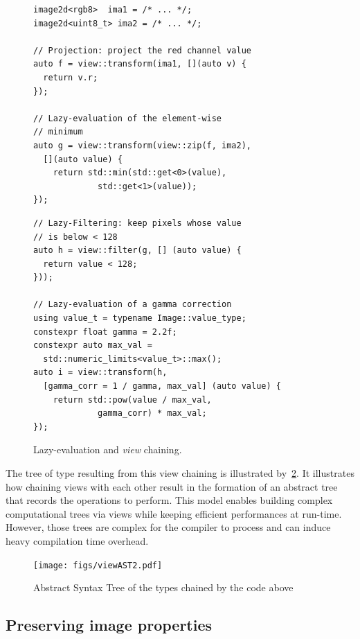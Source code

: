 \begin{figure}[htbp]
  \begin{minipage}[l]{0.48\linewidth}
    \begin{verbatim}
image2d<rgb8>  ima1 = /* ... */;
image2d<uint8_t> ima2 = /* ... */;

// Projection: project the red channel value
auto f = view::transform(ima1, [](auto v) {
  return v.r;
});

// Lazy-evaluation of the element-wise
// minimum
auto g = view::transform(view::zip(f, ima2),
  [](auto value) {
    return std::min(std::get<0>(value),
             std::get<1>(value));
});
\end{verbatim}
  \end{minipage}
  \hfill
  \begin{minipage}[l]{0.48\linewidth}
    \begin{verbatim}
// Lazy-Filtering: keep pixels whose value
// is below < 128
auto h = view::filter(g, [] (auto value) {
  return value < 128;
}));

// Lazy-evaluation of a gamma correction
using value_t = typename Image::value_type;
constexpr float gamma = 2.2f;
constexpr auto max_val =
  std::numeric_limits<value_t>::max();
auto i = view::transform(h,
  [gamma_corr = 1 / gamma, max_val] (auto value) {
    return std::pow(value / max_val,
             gamma_corr) * max_val;
});
\end{verbatim}
  \end{minipage}

  \caption{Lazy-evaluation and \emph{view} chaining.}
  \label{fig.lazy}
\end{figure}

The tree of type resulting from this view chaining is illustrated by~\cref{fig.viewAST}. It illustrates how chaining
views with each other result in the formation of an abstract tree that records the operations to perform. This model
enables building complex computational trees via views while keeping efficient performances at run-time. However, those
trees are complex for the compiler to process and can induce heavy compilation time overhead.

\begin{figure}[htb]
  \centering
  \texttt{[image: figs/viewAST2.pdf]}
  \caption{Abstract Syntax Tree of the types chained by the code above}
  \label{fig.viewAST}
\end{figure}


\subsection{Preserving image properties}

